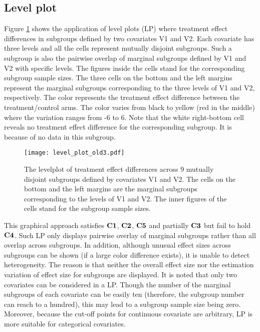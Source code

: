\documentclass[Afour,sagev,times, doublespace]{sagej}
\begin{document}
{\subsection{Level plot}
Figure \ref{fig:old_LP} shows the application of level plots (LP) where treatment effect differences in subgroups defined by two covariates V1 and V2. Each covariate has three levels and all the cells represent mutually disjoint subgroups. Such a subgroup is also the pairwise overlap of marginal subgroups defined by V1 and V2 with specific levels. The figures inside the cells stand for the corresponding subgroup sample sizes. The three cells on the bottom and the left margins represent the marginal subgroups corresponding to the three levels of V1 and V2, respectively. The color represents the treatment effect difference between the treatment/control arms. The color varies from black to yellow (red in the middle) where the variation ranges from -6 to 6. Note that the white right-bottom cell reveals no treatment effect difference for the corresponding subgroup. It is because of no data in this subgroup.

\begin{figure}%
\begin{center}
		\texttt{[image: level\_plot\_old3.pdf]} %
		\caption{The levelplot of treatment effect differences across 9 mutually disjoint subgroups defined by covariates V1 and V2.
         The cells on the bottom and the left margins are the marginal subgroups corresponding to the levels of V1 and V2. The inner figures of the cells stand for the subgroup sample sizes.}\label{fig:old_LP}
\end{center}
\end{figure}

This graphical approach satisfies $\bf C1$, $\bf C2$, $\bf C5$ and partially $\bf C3$ but fail to hold $\bf C4$. Such LP only displays pairwise overlay of marginal subgroups rather than all overlap across subgroups. In addition, although unusual effect sizes across subgroups can be shown (if a large color difference exists), it is unable to detect heterogeneity. The reason is that neither the overall effect size nor the estimation variation of effect size for subgroups are displayed. It is noted that only two covariates can be considered in a LP. Though the number of the marginal subgroups of each covariate can be easily ten (therefore, the subgroup number can reach to a hundred), this may lead to a subgroup sample size being zero. Moreover, because the cut-off points for continuous covariate are arbitrary, LP is more suitable for categorical covariates.

}
\end{document}
